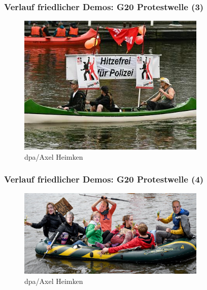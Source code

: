 \documentclass[]{beamer}
\begin{document}
	\begin{frame}
	\frametitle{Verlauf friedlicher Demos: G20 Protestwelle (3)}
	\begin{figure}
		\renewcommand{\figurename}{Foto} 
		\includegraphics[width=0.8\textwidth]{images/g20-protestwelle3}
		\caption{dpa/Axel Heimken}
	\end{figure}
\end{frame}

	\begin{frame}
	\frametitle{Verlauf friedlicher Demos: G20 Protestwelle (4)}
	\begin{figure}
		\renewcommand{\figurename}{Foto} 
		\includegraphics[width=0.8\textwidth]{images/g20-protestwelle4}
		\caption{dpa/Axel Heimken}
	\end{figure}
\end{frame}
\end{document}
